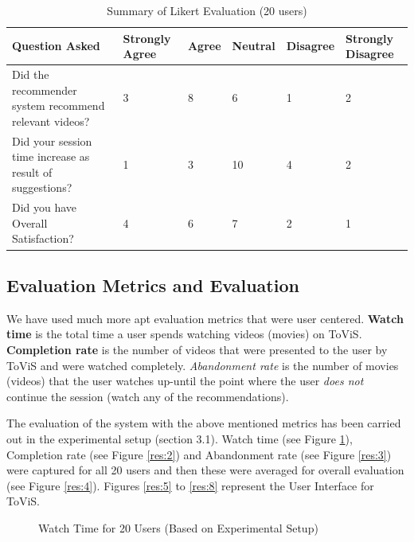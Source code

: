 \begin{table}[h]
  \centering
  \bgroup
  \def\arraystretch{1.5}
  \caption{Summary of Likert Evaluation (20 users)}
  \label{tab:2}
  \begin{tabular}{>{\raggedright}p{4.5cm}>{\raggedright}p{1.8cm}>{\raggedright}p{1.8cm}>{\raggedright}p{1.8cm}>{\raggedright}p{1.9cm}>{\raggedright}p{1.9cm}} 
    \toprule
    \textbf{Question Asked} & \textbf{Strongly Agree} & \textbf{Agree} & \textbf{Neutral} & \textbf{Disagree} & \textbf{Strongly Disagree} \tabularnewline
    \midrule
     Did the recommender system recommend relevant videos? & 3 & 8 & 6 & 1
& 2 \tabularnewline
     Did your session time increase as result of suggestions? & 1 & 3 & 10 & 4 & 2 \tabularnewline
     Did you have Overall Satisfaction? & 4 & 6 & 7 & 2 & 1 \tabularnewline
    \bottomrule
  \end{tabular}
  \egroup
\end{table}

\subsection{Evaluation Metrics and Evaluation}

We have used much more apt evaluation metrics that were user centered. \textbf{Watch time} is the total time a user spends watching videos (movies) on ToViS. \textbf{Completion rate} is the number of videos that were presented to the user by ToViS and were watched completely. \textit{Abandonment rate} is the number of movies (videos) that the user watches up-until the point where the user \textit{does not} continue the session (watch any of the recommendations). \par
The evaluation of the system with the above mentioned metrics has been carried out in the experimental setup (section 3.1). Watch time (see Figure \ref{res:1}), Completion rate (see Figure \ref{res:2}) and Abandonment rate (see Figure \ref{res:3}) were captured for all 20 users and then these were averaged for overall evaluation (see Figure \ref{res:4}). Figures \ref{res:5} to \ref{res:8} represent the User Interface for ToViS. 

\begin{figure}
	\centering
	\label{res:1}
	\caption{Watch Time for 20 Users (Based on Experimental Setup)}
\end{figure}



